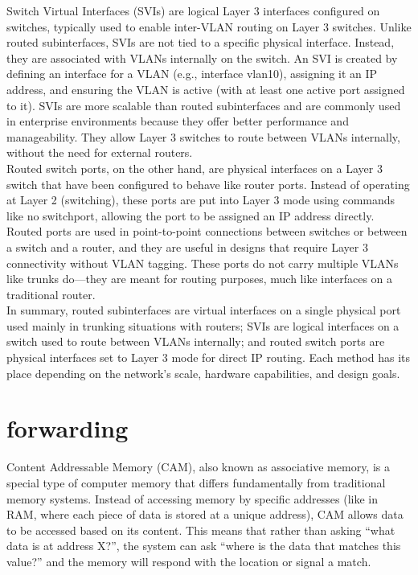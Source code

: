 \documentclass[parindent=0pt]{article}
\begin{document}
Switch Virtual Interfaces (SVIs) are logical Layer 3 interfaces configured on switches, typically used to enable inter-VLAN routing on Layer 3 switches. Unlike routed subinterfaces, SVIs are not tied to a specific physical interface. Instead, they are associated with VLANs internally on the switch. An SVI is created by defining an interface for a VLAN (e.g., interface vlan10), assigning it an IP address, and ensuring the VLAN is active (with at least one active port assigned to it). SVIs are more scalable than routed subinterfaces and are commonly used in enterprise environments because they offer better performance and manageability. They allow Layer 3 switches to route between VLANs internally, without the need for external routers.\\

Routed switch ports, on the other hand, are physical interfaces on a Layer 3 switch that have been configured to behave like router ports. Instead of operating at Layer 2 (switching), these ports are put into Layer 3 mode using commands like no switchport, allowing the port to be assigned an IP address directly. Routed ports are used in point-to-point connections between switches or between a switch and a router, and they are useful in designs that require Layer 3 connectivity without VLAN tagging. These ports do not carry multiple VLANs like trunks do—they are meant for routing purposes, much like interfaces on a traditional router.\\

In summary, routed subinterfaces are virtual interfaces on a single physical port used mainly in trunking situations with routers; SVIs are logical interfaces on a switch used to route between VLANs internally; and routed switch ports are physical interfaces set to Layer 3 mode for direct IP routing. Each method has its place depending on the network’s scale, hardware capabilities, and design goals.\\

\section*{forwarding}

Content Addressable Memory (CAM), also known as associative memory, is a special type of computer memory that differs fundamentally from traditional memory systems. Instead of accessing memory by specific addresses (like in RAM, where each piece of data is stored at a unique address), CAM allows data to be accessed based on its content. This means that rather than asking “what data is at address X?”, the system can ask “where is the data that matches this value?” and the memory will respond with the location or signal a match.\\
\end{document}
